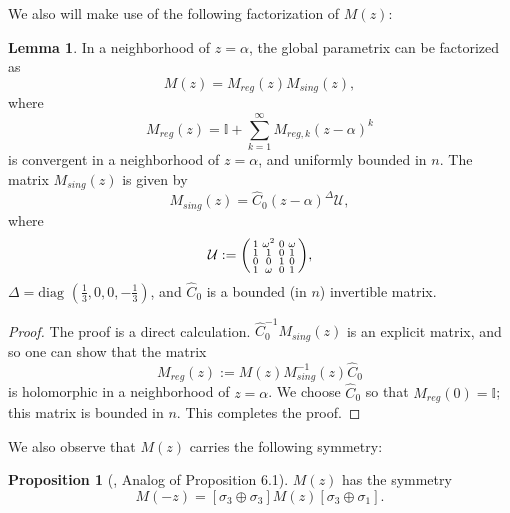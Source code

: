 \documentclass[usenames,dvipsnames]{article}
\theoremstyle{definition}
\newtheorem{lemma}{Lemma}[section]
\newtheorem{prop}{Proposition}[section]
\numberwithin{equation}{section}
\numberwithin{figure}{section}
\begin{document}
We also will make use of the following factorization of $M(z)$:
\begin{lemma}
    In a neighborhood of $z=\alpha$, the global parametrix can be factorized as
        \begin{equation}
            M(z) = M_{reg}(z) M_{sing}(z),
        \end{equation}
    where 
        \begin{equation}
            M_{reg}(z) = \mathbb{I} + \sum_{k=1}^{\infty} M_{reg,k}(z-\alpha)^k
        \end{equation}
    is convergent in a neighborhood of $z = \alpha$, and uniformly bounded in $n$. The matrix $M_{sing}(z)$ is given by
        \begin{equation}
            M_{sing}(z) = \hat{C}_0 (z-\alpha)^{\Delta} \mathcal{U},
        \end{equation}
    where
        \begin{equation*}
            \mathcal{U} :=
            \begin{psmallmatrix}
                1 & \omega^2 & 0 & \omega\\
                1 & 1 & 0 & 1\\
                0 & 0 & 1 & 0\\
                1 & \omega & 0 & 1
            \end{psmallmatrix},
        \end{equation*}
    $\Delta = \text{diag }\left(\frac{1}{3},0,0,-\frac{1}{3}\right)$, and $\hat{C}_0$ is a bounded (in $n$) invertible matrix.
\end{lemma}
\begin{proof}
    The proof is a direct calculation. $\hat{C}_0^{-1}M_{sing}(z)$ is an explicit matrix, and so one can show that the matrix
        \begin{equation*}
            M_{reg}(z) := M(z)M_{sing}^{-1}(z)\hat{C}_0
        \end{equation*}
    is holomorphic in a neighborhood of $z=\alpha$. We choose $\hat{C}_0$ so that $M_{reg}(0)=\mathbb{I}$; this matrix is bounded in $n$.
    This completes the proof.
\end{proof}

We also observe that $M(z)$ carries the following symmetry:
\begin{prop}[\cite{DHL1}, Analog of Proposition 6.1]\label{global-parametrix-prop} 
    $M(z)$ has the symmetry
        \begin{equation} \label{global-parametrix-symmetry}
            M(-z) = \left[\sigma_3 \oplus \sigma_3 \right] M(z) [\sigma_3 \oplus \sigma_1].
        \end{equation}
\end{prop}
\end{document}
